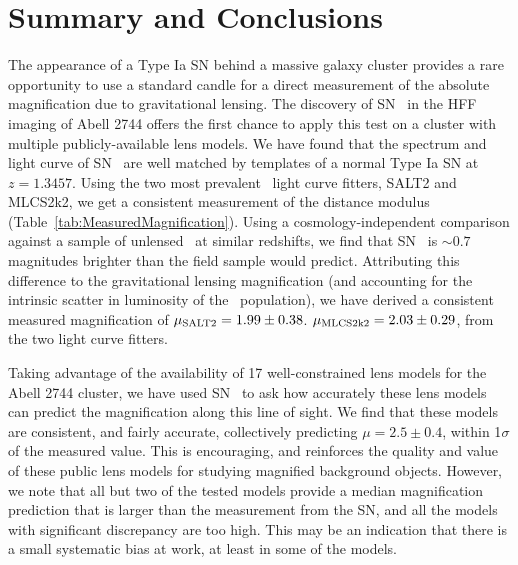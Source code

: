 %
%
%
%
%
%


\section{Summary and Conclusions}
\label{sec:SummaryAndConclusions}

The appearance of a Type Ia SN behind a massive galaxy cluster
provides a rare opportunity to use a standard candle for a direct
measurement of the absolute magnification due to gravitational
lensing.  The discovery of SN \tomas\ in the HFF imaging of Abell 2744
offers the first chance to apply this test on a cluster with multiple
publicly-available lens models.  We have found that the spectrum and
light curve of SN \tomas\ are well matched by templates of a normal
Type Ia SN at $z=1.3457$.  Using the two most prevalent \SNIa\ light
curve fitters, SALT2 and MLCS2k2, we get a consistent measurement of
the distance modulus (Table~\ref{tab:MeasuredMagnification}).  Using a
cosmology-independent comparison against a sample of unlensed \SNeIa\
at similar redshifts, we find that SN \tomas\ is $\sim0.7$ magnitudes
brighter than the field sample would predict.  Attributing this
difference to the gravitational lensing magnification (and accounting
for the intrinsic scatter in luminosity of the \SNIa\ population), we
have derived a consistent measured magnification of $\mu_{\rm
SALT2}=1.99\pm0.38$.  $\mu_{\rm MLCS2k2}=2.03\pm0.29$, from the two
light curve fitters.

Taking advantage of the availability of 17 well-constrained lens
models for the Abell 2744 cluster, we have used SN \tomas\ to ask how
accurately these lens models can predict the magnification along this
line of sight.  We find that these models are consistent, and fairly
accurate, collectively predicting $\mu=2.5\pm0.4$, within 1$\sigma$ of
the measured value.  This is encouraging, and reinforces the quality
and value of these public lens models for studying magnified
background objects.  However, we note that all but two of the tested
models provide a median magnification prediction that is larger than
the measurement from the SN, and all the models with significant
discrepancy are too high.  This may be an indication that there is a
small systematic bias at work, at least in some of the models. 

